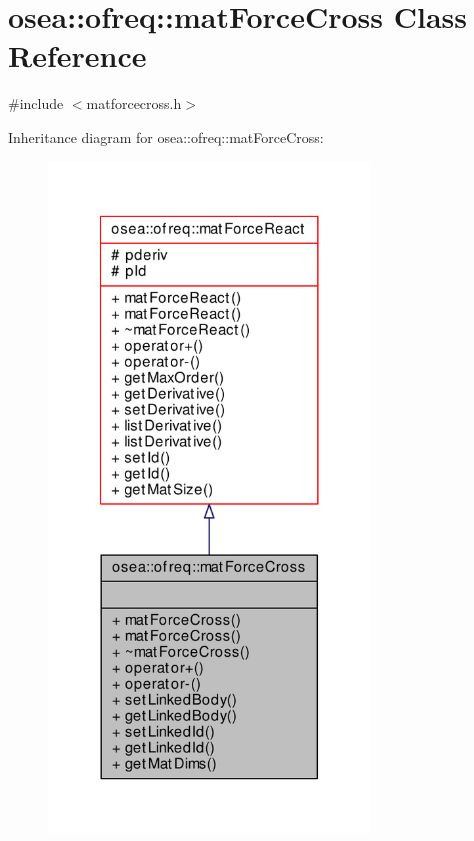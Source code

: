 \hypertarget{classosea_1_1ofreq_1_1mat_force_cross}{\section{osea\-:\-:ofreq\-:\-:mat\-Force\-Cross Class Reference}
\label{classosea_1_1ofreq_1_1mat_force_cross}
}


{\ttfamily \#include $<$matforcecross.\-h$>$}



Inheritance diagram for osea\-:\-:ofreq\-:\-:mat\-Force\-Cross\-:
\nopagebreak
\begin{figure}[H]
\begin{center}
\leavevmode
\includegraphics[width=242pt]{classosea_1_1ofreq_1_1mat_force_cross__inherit__graph}
\end{center}
\end{figure}
